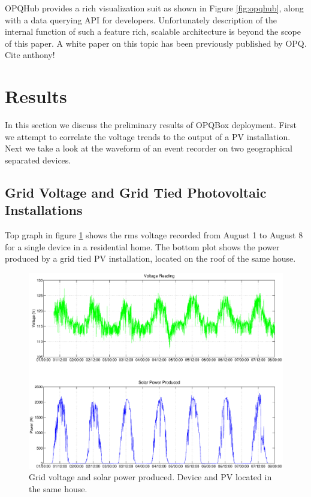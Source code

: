 OPQHub provides a rich visualization suit as shown in Figure \ref{fig:opqhub}, along with a data querying API for developers. Unfortunately description of the internal function
of such a feature rich, scalable architecture is beyond the scope of this paper. A white paper on this topic has been previously published by OPQ. Cite anthony!

\section{Results}

In this section we discuss the preliminary results of  OPQBox deployment. First we attempt to correlate the voltage trends to the output of a PV installation. Next we take a look at the 
waveform of an event recorder on two geographical separated devices.

\subsection{Grid Voltage and Grid Tied Photovoltaic Installations}
Top graph in figure \ref{fig:samehouse} shows the rms voltage recorded from August 1 to August 8 for a single device in a residential home. The bottom plot shows the power produced by 
a grid tied PV installation, located on the roof of the same house.

\begin{figure}[h!]
\centering
\includegraphics[width=\textwidth]{img/solarCorelationSameHouse.eps}
\caption{Grid voltage and solar power produced. Device and PV located in the same house.}
\label{fig:samehouse}
\end{figure}

